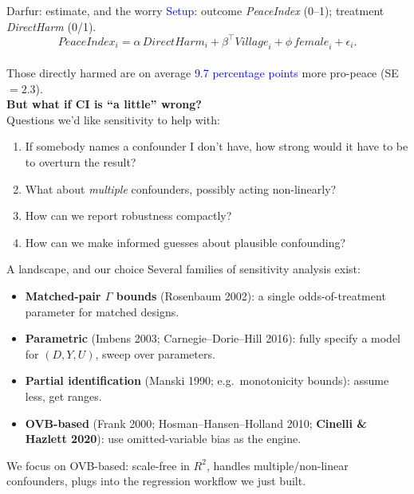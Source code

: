 \documentclass[xcolor=dvipsnames]{beamer}
\begin{document}
\begin{frame}{Darfur: estimate, and the worry}
\small
{} \textcolor{Blue}{Setup}: outcome \textit{PeaceIndex} (0--1); treatment \textit{DirectHarm} (0/1).\\
\smallskip
{}
\[
\mathit{PeaceIndex}_i = \alpha\,\mathit{DirectHarm}_i + \beta^\top \mathit{Village}_i + \phi\, \mathit{female}_i + \epsilon_i.
\]\\
 Those directly harmed are on average \textcolor{Blue}{9.7 percentage points} more pro-peace (SE $= 2.3$).\\
\medskip
{} \textbf{But what if CI is ``a little'' wrong?}\\
\medskip
{} Questions we'd like sensitivity to help with:\\
\begin{enumerate}
\item<6-> If somebody names a confounder I don't have, how strong would it have to be to overturn the result?
\item<7-> What about \textit{multiple} confounders, possibly acting non-linearly?
\item<8-> How can we report robustness compactly?
\item<9-> How can we make informed guesses about plausible confounding?
\end{enumerate}
\end{frame}


\begin{frame}{A landscape, and our choice}
 Several families of sensitivity analysis exist:
\small
\begin{itemize}
\item<2-> \textbf{Matched-pair $\Gamma$ bounds} (Rosenbaum 2002): a single odds-of-treatment parameter for matched designs.
\smallskip
\item<3-> \textbf{Parametric} (Imbens 2003; Carnegie--Dorie--Hill 2016): fully specify a model for $(D, Y, U)$, sweep over parameters.
\smallskip
\item<4-> \textbf{Partial identification} (Manski 1990; e.g.\ monotonicity bounds): assume less, get ranges.
\smallskip
\item<5-> \textbf{OVB-based} (Frank 2000; Hosman--Hansen--Holland 2010; \textbf{Cinelli \& Hazlett 2020}): use omitted-variable bias as the engine.
\end{itemize}
\bigskip
{} We focus on OVB-based: scale-free in $R^2$, handles multiple/non-linear confounders, plugs into the regression workflow we just built.
\end{frame}
\end{document}
